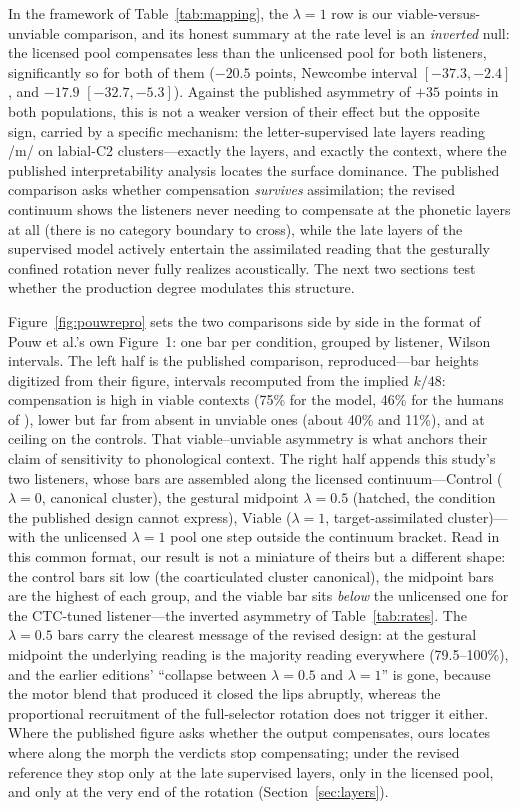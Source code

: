 \documentclass[11pt,a4paper]{article}
\newcommand{\lam}{\lambda}
\begin{document}
In the framework of Table~\ref{tab:mapping}, the $\lam=1$ row is our
viable-versus-unviable comparison, and its honest summary at the rate
level is an \emph{inverted} null: the licensed pool compensates less
than the unlicensed pool for both listeners, significantly so for
both of them ($-20.5$ points, Newcombe interval $[-37.3, -2.4]$, and
$-17.9$ $[-32.7, -5.3]$).
Against the published asymmetry of $+35$ points in both populations,
this is not a weaker version of their effect but the opposite sign,
carried by a specific mechanism: the letter-supervised late layers
reading /m/ on labial-C2 clusters---exactly the layers, and exactly
the context, where the published interpretability analysis locates
the surface dominance. The published comparison asks whether
compensation \emph{survives} assimilation; the revised continuum
shows the listeners never needing to compensate at the phonetic
layers at all (there is no category boundary to cross), while the
late layers of the supervised model actively entertain the
assimilated reading that the gesturally confined rotation never
fully realizes acoustically. The next two sections test whether the
production degree modulates this structure.

Figure~\ref{fig:pouwrepro} sets the two comparisons side by side in
the format of Pouw et al.'s own Figure~1: one bar per condition,
grouped by listener, Wilson intervals. The left half is the published
comparison, reproduced---bar heights digitized from their figure,
intervals recomputed from the implied $k/48$: compensation is high in
viable contexts (75\% for the model, 46\% for the humans of
\citealp{darcy2009}), lower but far from absent in unviable ones
(about 40\% and 11\%), and at ceiling on the controls. That
viable--unviable asymmetry is what anchors their claim of
sensitivity to phonological context. The right half appends this
study's two listeners, whose bars are assembled along the licensed
continuum---Control ($\lam=0$, canonical cluster), the gestural
midpoint $\lam=0.5$ (hatched, the condition the published design
cannot express), Viable ($\lam=1$, target-assimilated cluster)---with
the unlicensed $\lam=1$ pool one step outside the continuum bracket.
Read in this common format, our result is not a miniature of theirs
but a different shape: the control bars sit low (the coarticulated
cluster canonical), the midpoint bars are the highest of each group,
and the viable bar sits \emph{below} the unlicensed one for the
CTC-tuned listener---the inverted asymmetry of Table~\ref{tab:rates}.
The $\lam=0.5$ bars carry the clearest message of the revised
design: at the gestural midpoint the underlying reading is the
majority reading everywhere (79.5--100\%), and the earlier editions'
``collapse between $\lam=0.5$ and $\lam=1$'' is gone, because the
motor blend that produced it closed the lips abruptly, whereas the
proportional recruitment of the full-selector rotation does not
trigger it either. Where the published figure asks whether the output
compensates, ours locates where along the morph the verdicts stop
compensating; under the revised reference they stop only at the late
supervised layers, only in the licensed pool, and only at the very
end of the rotation (Section~\ref{sec:layers}).
\end{document}
